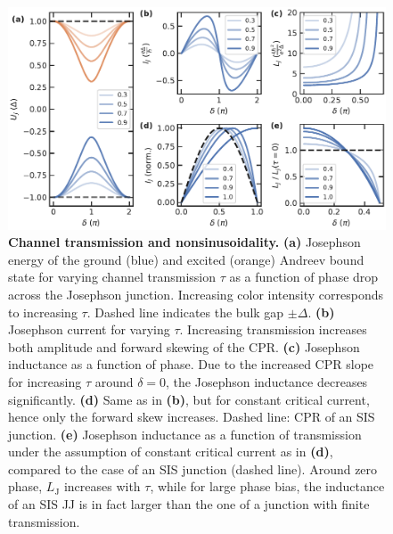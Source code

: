 \begin{figure}[t]
	\centering
	\includegraphics[width=\linewidth]{chapter-introduction/figs/model_SNS_EjIc_full}
	\caption{
		\textbf{Channel transmission and nonsinusoidality.}
		\textbf{(a)} Josephson energy of the ground (blue) and excited (orange) Andreev bound state for varying channel transmission $\tau$ as a function of phase drop across the Josephson junction.
		Increasing color intensity corresponds to increasing $\tau$.
		Dashed line indicates the bulk gap $\pm\Delta$.
		\textbf{(b)} Josephson current for varying $\tau$.
		Increasing transmission increases both amplitude and forward skewing of the CPR.
		\textbf{(c)} Josephson inductance as a function of phase. %
		Due to the increased CPR slope for increasing $\tau$ around $\delta=0$, the Josephson inductance decreases significantly.
		\textbf{(d)} Same as in \textbf{(b)}, but for constant critical current, hence only the forward skew increases.
		Dashed line: CPR of an SIS junction.
		\textbf{(e)} Josephson inductance as a function of transmission under the assumption of constant critical current as in \textbf{(d)}, compared to the case of an SIS junction (dashed line).
		Around zero phase, $L_\text{J}$ increases with $\tau$, while for large phase bias, the inductance of an SIS JJ is in fact larger than the one of a junction with finite transmission.
	}
	\label{fig:modelsnsejic}
\end{figure}

